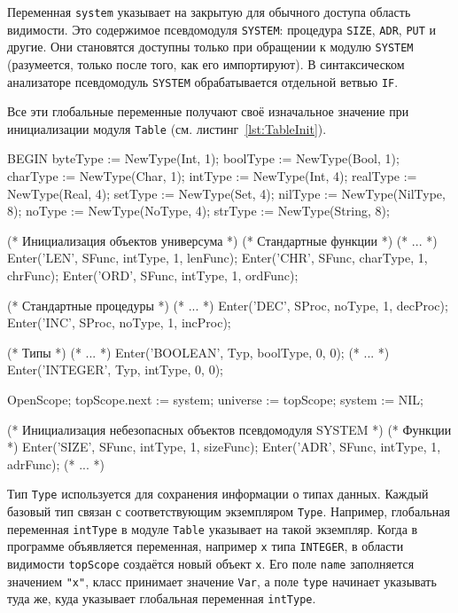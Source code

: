 \documentclass[utf8]{lgu}
\newcommand{\captionlisting}[1]{%
  \captionsetup{type=listing}%
  \captionof{listing}{#1}%
  \vspace{-11pt}%
}
\newcommand{\code}[1]{{\normalsize\texttt{#1}}}
\begin{document}
Переменная \code{system} указывает на закрытую для обычного доступа область видимости. Это содержимое псевдомодуля \code{SYSTEM}: процедура \code{SIZE}, \code{ADR}, \code{PUT} и другие. Они становятся доступны только при обращении к модулю \code{SYSTEM} (разумеется, только после того, как его импортируют). В синтаксическом анализаторе псевдомодуль \code{SYSTEM} обрабатывается отдельной ветвью \code{IF}.

Все эти глобальные переменные получают своё изначальное значение при инициализации модуля \code{Table} (см. листинг~\ref{lst:TableInit}).

\captionsetup{type=listing}
\captionlisting{Инициализация модуля Table}
\label{lst:TableInit}
\begin{modula2long}
BEGIN
  byteType := NewType(Int,       1);
  boolType := NewType(Bool,     1);
  charType := NewType(Char,     1);
  intType   := NewType(Int,      4);
  realType := NewType(Real,     4);
  setType  := NewType(Set,      4);
  nilType   := NewType(NilType,  8);
  noType   := NewType(NoType,  4);
  strType  := NewType(String,    8);

  (* Инициализация объектов универсума *)
  (* Стандартные функции *)
  (* ... *)
  Enter('LEN', SFunc, intType,   1, lenFunc);
  Enter('CHR', SFunc, charType, 1, chrFunc);
  Enter('ORD', SFunc, intType,   1, ordFunc);

  (* Стандартные процедуры *)
  (* ... *)
  Enter('DEC', SProc, noType, 1, decProc);
  Enter('INC', SProc, noType, 1, incProc);

  (* Типы *)
  (* ... *)
  Enter('BOOLEAN', Typ, boolType, 0, 0);
  (* ... *)
  Enter('INTEGER',  Typ,  intType,  0, 0);

  OpenScope;
  topScope.next := system;
  universe := topScope;
  system := NIL;

  (* Инициализация небезопасных объектов
     псевдомодуля SYSTEM *)
  (* Функции *)
  Enter('SIZE', SFunc, intType, 1, sizeFunc);
  Enter('ADR', SFunc, intType, 1, adrFunc);
  (* ... *)
\end{modula2long}

Тип \code{Type} используется для сохранения информации о типах данных. Каждый базовый тип связан с соответствующим экземпляром \code{Type}. Например, глобальная переменная \code{intType} в модуле \code{Table} указывает на такой экземпляр. Когда в программе объявляется переменная, например \code{x} типа \code{INTEGER}, в области видимости \code{topScope} создаётся новый объект \code{x}. Его поле \code{name} заполняется значением \code{"x"}, класс принимает значение \code{Var}, а поле \code{type} начинает указывать туда же, куда указывает глобальная переменная \code{intType}.
\end{document}
